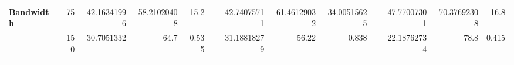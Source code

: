 \begin{table*}[]
{\begin{tabular}{lrrrrlrrrlrrr}
\textbf{Bandwidth}   & 75                        & 42.16341996                                                                     & 58.21020408                                                                     & 15.2                                                                            &           & 42.74075711                                                                     & 61.46129032                                                                     & 34.00515625                                                                     &           & 47.77007301                                                                     & 70.37692308                                                                     & 16.8                                                                            \\
                     & 150                       & 30.7051332                                                                      & 64.7                                                                            & 0.535                                                                           &           & 31.18818279                                                                     & 56.22                                                                           & 0.838                                                                           &           & 22.18762734                                                                     & 78.8                                                                            & 0.415                                                                           \\
                     & \multicolumn{1}{l}{}      & \multicolumn{1}{l}{}                                                            & \multicolumn{1}{l}{}                                                            & \multicolumn{1}{l}{}                                                            &           & \multicolumn{1}{l}{}                                                            & \multicolumn{1}{l}{}                                                            & \multicolumn{1}{l}{}                                                            &           & \multicolumn{1}{l}{}                                                            & \multicolumn{1}{l}{}                                                            & \multicolumn{1}{l}{}                                                            \\

\end{tabular}}
\end{table*}
